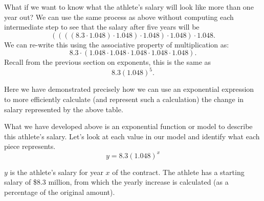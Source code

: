 \documentclass{ximera}
\begin{document}
What if we want to know what the athlete's salary will look like more than one year out? We can use the same process as above without computing each intermediate step to see that the salary after five years will be
%
$$
((((8.3 \cdot 1.048) \cdot 1.048)  \cdot 1.048) \cdot 1.048) \cdot 1.048.
$$
%
We can re-write this using the associative property of multiplication as: 
%
$$
8.3 \cdot (1.048 \cdot 1.048 \cdot 1.048 \cdot 1.048 \cdot 1.048).
$$
%
Recall from the previous section on exponents, this is the same as
%
$$
8.3(1.048)^5.
$$

Here we have demonstrated precisely how we can use an exponential expression to more efficiently calculate (and represent such a calculation) the change in salary represented by the above table.

What we have developed above is an exponential function or model to describe this athlete's salary.  Let's look at each value in our model and identify what each piece represents.
$$
y = 8.3(1.048)^x
$$

$y$ is the athlete's salary for year $x$ of the contract. The athlete has a starting salary of \$8.3 million, from which the yearly increase is calculated (as a percentage of the original amount). 
\end{document}
